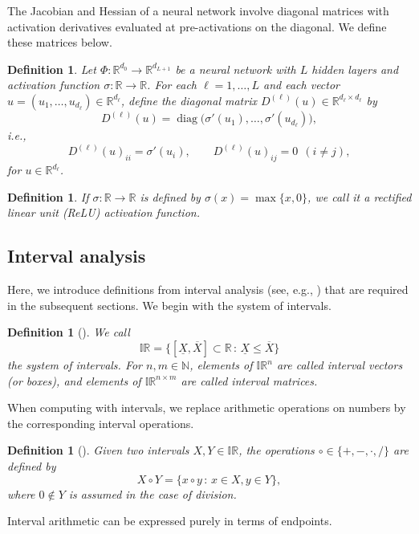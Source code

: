 \documentclass[a4paper, 11pt]{article}
\newtheorem{definition}[theorem]{Definition}
\begin{document}
	
	The Jacobian and Hessian of a neural network involve diagonal matrices with activation derivatives evaluated at pre-activations on the diagonal. We define these matrices below.
	
	\begin{definition}\label{def: diag D}
		Let $\Phi : \mathbb{R}^{d_0} \to \mathbb{R}^{d_{L+1}}$ be a neural network with $L$ hidden layers and activation function $\sigma \colon \mathbb{R} \to \mathbb{R}$.
		For each $\ell=1,\dots,L$ and each vector $u=(u_1,\dots,u_{d_\ell})\in\mathbb{R}^{d_\ell}$, define the diagonal matrix $D^{(\ell)}(u)\in\mathbb{R}^{d_\ell\times d_\ell}$ by
		\[
		D^{(\ell)}(u) = \operatorname{diag}\!\big(\sigma'(u_1),\dots,\sigma'(u_{d_\ell})\big),
		\]
		i.e.,
		\[
		D^{(\ell)}(u)_{ii} = \sigma'(u_i), \qquad D^{(\ell)}(u)_{ij}=0 \ \ (i\neq j),
		\]
		for $u \in \mathbb{R}^{d_\ell}$.
	\end{definition}
	
	
	\begin{definition}\label{def:ReLUActivationFunction}
		If $\sigma : \mathbb{R} \to \mathbb{R}$ is defined by $\sigma(x) = \max\{x, 0\}$, we call it a rectified linear unit (ReLU) activation function.
	\end{definition}
	
	
	\subsection{Interval analysis}\label{subsec: interval analysis}
	Here, we introduce definitions from interval analysis (see, e.g., \cite{moore2009introduction,rump2010verification}) that are required in the subsequent sections. We begin with the system of intervals.
	
	
	\begin{definition}[\cite{rump2010verification}]
		We call
		\begin{equation}
			\mathbb{IR} = \{ [\underline{X}, \overline{X}]\subset \mathbb{R} \, : \,   \underline{X}\leq \overline{X}\}
		\end{equation}
		the system of intervals. For $n,m\in\mathbb{N}$, elements of $\mathbb{IR}^n$ are called interval vectors (or boxes), and elements of $\mathbb{IR}^{n \times m}$ are called interval matrices.
	\end{definition}
	When computing with intervals, we replace arithmetic operations on numbers by the corresponding interval operations.
	\begin{definition}[\cite{rump2010verification}]\label{def:IntArit}
		Given two intervals $X,Y \in \mathbb{IR}$, the operations $\circ \in \{+,-,\cdot,/\}$ are defined by
		\begin{equation}
			X \circ Y = \{ x \circ y \, : \, x\in X, y \in Y\},
		\end{equation}
		where $0\notin Y$ is assumed in the case of division.
	\end{definition}
	Interval arithmetic can be expressed purely in terms of endpoints.
	
\end{document}
